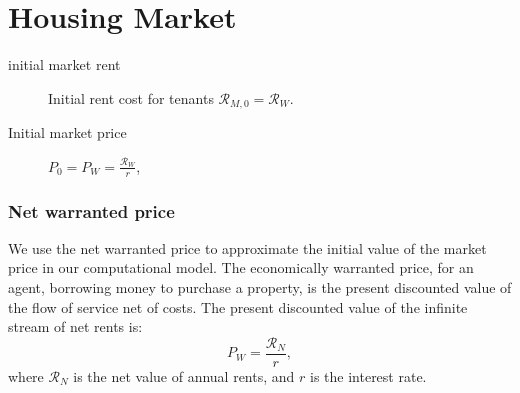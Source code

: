 \section{Housing Market}
\begin{description}
\item [initial market rent] 
Initial rent cost for tenants  $\mathcal{R}_{M, 0}= \mathcal{R}_W$.

\item [Initial market price] 
$P_0= P_W=\frac{\mathcal{R}_W }{r}$,  
\end{description}


\subsubsection{Net warranted price} \label{section-warranted-price}
We use the net warranted price to approximate the initial value of the market price in our computational model. 
The economically \gls{warranted price}, for an agent, borrowing money to purchase a property, is the present discounted value of the flow of service net of costs. The present discounted value of the infinite stream of net rents is:
\begin{equation}
P_W=\frac{\mathcal{R}_N}{r},  
\label{eqn-price-warranted}
\end{equation}
where $\mathcal{R}_N$ is the net value of annual rents, and $r$ is the interest rate.  


